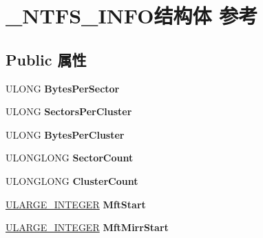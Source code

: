 \hypertarget{struct___n_t_f_s___i_n_f_o}{}\section{\+\_\+\+N\+T\+F\+S\+\_\+\+I\+N\+F\+O结构体 参考}
\label{struct___n_t_f_s___i_n_f_o}
\subsection*{Public 属性}
\begin{DoxyCompactItemize}
\item 
\mbox{\label{struct___n_t_f_s___i_n_f_o_a84503ec1bd35fe4f23ddc5645453eef6}} 
U\+L\+O\+NG {\bfseries Bytes\+Per\+Sector}
\item 
\mbox{\label{struct___n_t_f_s___i_n_f_o_accb2ef6e8a17c8ea54b29abf2e1e0a36}} 
U\+L\+O\+NG {\bfseries Sectors\+Per\+Cluster}
\item 
\mbox{\label{struct___n_t_f_s___i_n_f_o_a26b5c378f8bd699cde10dc74ae1633ad}} 
U\+L\+O\+NG {\bfseries Bytes\+Per\+Cluster}
\item 
\mbox{\label{struct___n_t_f_s___i_n_f_o_af7b66af98b7b0888455ea270b7ea441b}} 
U\+L\+O\+N\+G\+L\+O\+NG {\bfseries Sector\+Count}
\item 
\mbox{\label{struct___n_t_f_s___i_n_f_o_a5add77e85e5f8e8a79c530b7111795b0}} 
U\+L\+O\+N\+G\+L\+O\+NG {\bfseries Cluster\+Count}
\item 
\mbox{\label{struct___n_t_f_s___i_n_f_o_a01cb59092e9ced0b468dddea388694e4}} 
\hyperlink{struct___u_l_a_r_g_e___i_n_t_e_g_e_r}{U\+L\+A\+R\+G\+E\+\_\+\+I\+N\+T\+E\+G\+ER} {\bfseries Mft\+Start}
\item 
\mbox{\label{struct___n_t_f_s___i_n_f_o_a89ab9341a39e4ae0e1dd992eefe87fe9}} 
\hyperlink{struct___u_l_a_r_g_e___i_n_t_e_g_e_r}{U\+L\+A\+R\+G\+E\+\_\+\+I\+N\+T\+E\+G\+ER} {\bfseries Mft\+Mirr\+Start}
\item 
\mbox{\label{struct___n_t_f_s___i_n_f_o_a34d45b5076b917e948f762891cb1f9c0}} 

\end{DoxyCompactItemize}
